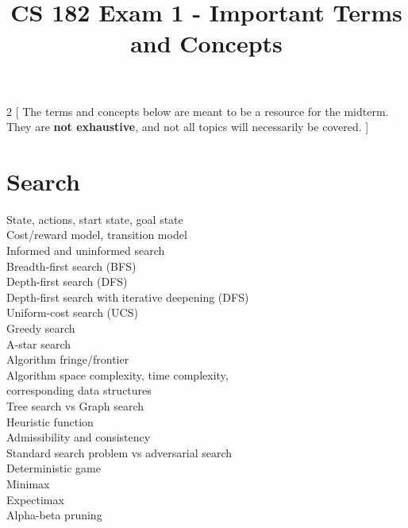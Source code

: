 \documentclass[a4paper]{article}
\title{CS 182 Exam 1 - Important Terms and Concepts\vspace{-4ex}}
\begin{document}
\maketitle

\begin{multicols*}{2}
[
\noindent The terms and concepts below are meant to be a resource for the midterm. They are \textbf{not exhaustive}, and not all topics will necessarily be covered.
]
\section{Search}
State, actions, start state, goal state\\
Cost/reward model, transition model \\
Informed and uninformed search \\
Breadth-first search (BFS) \\
Depth-first search (DFS)\\
Depth-first search with iterative deepening (DFS)\\
Uniform-cost search (UCS)\\
Greedy search\\
A-star search\\
Algorithm fringe/frontier \\
Algorithm space complexity, time complexity, \\
corresponding data structures\\
Tree search vs Graph search\\
Heuristic function \\
Admissibility and consistency \\
Standard search problem vs adversarial search \\
Deterministic game \\
Minimax \\
Expectimax \\
Alpha-beta pruning



\end{multicols*}
\end{document}
